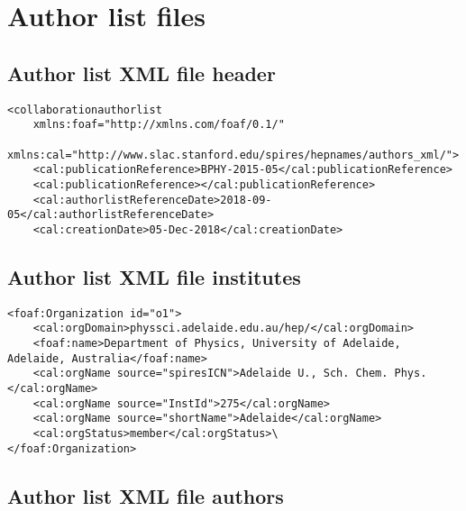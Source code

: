 \section{Author list files}%
\label{app:authorlist}

\subsection{Author list XML file header}%
\label{app:author:xmlheader}

\begin{lstlisting}
<collaborationauthorlist
    xmlns:foaf="http://xmlns.com/foaf/0.1/"
    xmlns:cal="http://www.slac.stanford.edu/spires/hepnames/authors_xml/">
    <cal:publicationReference>BPHY-2015-05</cal:publicationReference>
    <cal:publicationReference></cal:publicationReference>
    <cal:authorlistReferenceDate>2018-09-05</cal:authorlistReferenceDate>
    <cal:creationDate>05-Dec-2018</cal:creationDate>
\end{lstlisting}


\subsection{Author list XML file institutes}%
\label{app:author:xmlinstitute}

\begin{lstlisting}
<foaf:Organization id="o1">
    <cal:orgDomain>physsci.adelaide.edu.au/hep/</cal:orgDomain>
    <foaf:name>Department of Physics, University of Adelaide, Adelaide, Australia</foaf:name>
    <cal:orgName source="spiresICN">Adelaide U., Sch. Chem. Phys.</cal:orgName>
    <cal:orgName source="InstId">275</cal:orgName>
    <cal:orgName source="shortName">Adelaide</cal:orgName>
    <cal:orgStatus>member</cal:orgStatus>\
</foaf:Organization>
\end{lstlisting}


\subsection{Author list XML file authors}%
\label{app:author:xmlauthor}

